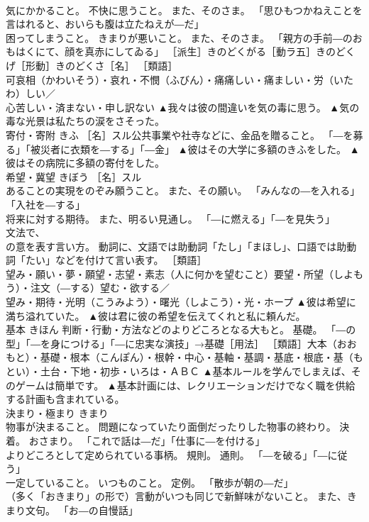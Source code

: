 \documentclass[8pt]{extreport}
\begin{document}
\begin{CJK}{UTF8}{min}
\\	気にかかること。 不快に思うこと。 また、そのさま。 「思ひもつかねえことを言はれると、おいらも腹は立たねえが―だ」 
\\	困ってしまうこと。 きまりが悪いこと。 また、そのさま。 「親方の手前―のおもはくにて、顔を真赤にしてゐる」 ［派生］きのどくがる［動ラ五］きのどくげ［形動］きのどくさ［名］ ［類語］
\\	可哀相（かわいそう）・哀れ・不憫（ふびん）・痛痛しい・痛ましい・労（いたわ）しい／
\\	心苦しい・済まない・申し訳ない	▲我々は彼の間違いを気の毒に思う。 ▲気の毒な光景は私たちの涙をさそった。
\\	寄付・寄附	きふ	［名］スル公共事業や社寺などに、金品を贈ること。 「―を募る」「被災者に衣類を―する」「―金」	▲彼はその大学に多額のきふをした。 ▲彼はその病院に多額の寄付をした。
\\	希望・冀望	きぼう	［名］スル 
\\	あることの実現をのぞみ願うこと。 また、その願い。 「みんなの―を入れる」「入社を―する」 
\\	将来に対する期待。 また、明るい見通し。 「―に燃える」「―を見失う」 
\\	文法で、 
\\	の意を表す言い方。 動詞に、文語では助動詞「たし」「まほし」、口語では助動詞「たい」などを付けて言い表す。 ［類語］
\\	望み・願い・夢・願望・志望・素志（人に何かを望むこと）要望・所望（しよもう）・注文（―する）望む・欲する／
\\	望み・期待・光明（こうみよう）・曙光（しよこう）・光・ホープ	▲彼は希望に満ち溢れていた。 ▲彼は君に彼の希望を伝えてくれと私に頼んだ。
\\	基本	きほん	判断・行動・方法などのよりどころとなる大もと。 基礎。 「―の型」「―を身につける」「―に忠実な演技」→基礎［用法］ ［類語］大本（おおもと）・基礎・根本（こんぽん）・根幹・中心・基軸・基調・基底・根底・基（もとい）・土台・下地・初歩・いろは・ＡＢＣ	▲基本ルールを学んでしまえば、そのゲームは簡単です。 ▲基本計画には、レクリエーションだけでなく職を供給する計画も含まれている。
\\	決まり・極まり	きまり	
\\	物事が決まること。 問題になっていたり面倒だったりした物事の終わり。 決着。 おさまり。 「これで話は―だ」「仕事に―を付ける」 
\\	よりどころとして定められている事柄。 規則。 通則。 「―を破る」「―に従う」 
\\	一定していること。 いつものこと。 定例。 「散歩が朝の―だ」 
\\	（多く「おきまり」の形で）言動がいつも同じで新鮮味がないこと。 また、きまり文句。 「お―の自慢話」 

\end{CJK}
\end{document}
